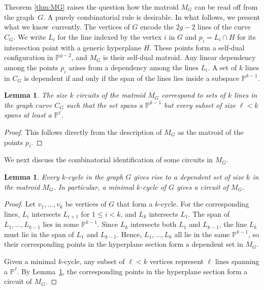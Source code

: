 \documentclass[12pt]{extarticle}
\newtheorem{lemma}[theorem]{Lemma}
\theoremstyle{definition}
\numberwithin{theorem}{section}
\theoremstyle{plain}\newtheorem{ithm}{Theorem}
\newcommand{\PP}{\mathbb{P}}
\begin{document}
Theorem \ref{thm:MG} raises the question how 
the matroid $M_G$ can be read off from the graph~$G$.
A purely combinatorial rule is desirable.
In what follows, we present what we know~currently.
The vertices of $G$ encode the $2g-2$ lines of the curve $C_G$.
We write $L_i$ for the line 
indexed by the vertex $i$ in $G$ and
$p_i = L_i\cap H$ for its intersection point with a generic hyperplane $H$.
These points form a self-dual configuration in $\PP^{g-2}$, and $M_G$
is their self-dual matroid.
Any linear dependency among the points $p_i$ arises
from a dependency among the lines $L_i$.
A set of $k$ lines in $C_G$ is dependent if and only if the span of the lines lies inside a subspace $\PP^{k-1}$.

\begin{lemma}\label{lem:circuits}
The size $k$ circuits of the matroid $M_G$ correspond to sets of $k$ lines in the graph curve $C_G$ 
such that the set spans a $\PP^{k-1}$ but every subset of size $\ell<k$ spans at least a $\PP^{\ell}$.
\end{lemma}

\begin{proof}
  This follows directly from the description of $M_G$ as the matroid of the points $p_i$.
\end{proof}

We next discuss the combinatorial identification of some circuits in $M_G$.

\begin{lemma} \label{lemma:cycle-dependent}
  Every $k$-cycle in the graph $G$ gives rise to a dependent set of size $k$ in 
  the matroid $M_G$. In particular, a minimal $k$-cycle of $G$ gives a circuit of $M_G$.
\end{lemma}

\begin{proof}
Let $v_1,\ldots,v_k$ be vertices of $G$ that form a  $k$-cycle.
For the corresponding lines,
   $L_i$ intersects $L_{i+1}$ for $1\leq i < k$, and $L_k$ intersects $L_1$. The span of $L_1,\dots,L_{k-1}$ lies 
   in some $\PP^{k-1}$. Since $L_k$ intersects both $L_1$ and $L_{k-1}$, the line $L_k$ must lie in the span of $L_1$ and $L_{k-1}$. Hence, $L_1,\dots,L_{k}$ all lie in the same $\PP^{k-1}$, so their corresponding points in the hyperplane section form a dependent set in $M_G$.
   
  
  Given a minimal $k$-cycle, any subset of $\ell<k$ vertices represent $\ell$ lines spanning a $\PP^{\ell}$. By Lemma~\ref{lem:circuits}, the corresponding points in the hyperplane section form a circuit of $M_G.$
\end{proof}
\end{document}
